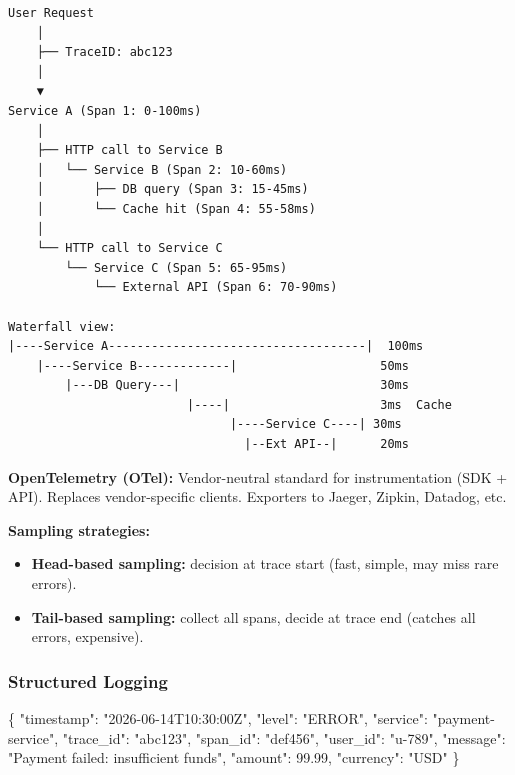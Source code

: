 \documentclass[11pt]{article}
\providecommand{\tightlist}{\setlength{\itemsep}{1pt}\setlength{\parskip}{0pt}}
\newenvironment{Shaded}{\begin{snugshade}}{\end{snugshade}}
\newcommand{\DataTypeTok}[1]{\textcolor[rgb]{0.16,0.50,0.73}{#1}}
\newcommand{\FloatTok}[1]{\textcolor[rgb]{0.96,0.45,0.00}{#1}}
\newcommand{\FunctionTok}[1]{\textcolor[rgb]{0.56,0.27,0.68}{#1}}
\newcommand{\StringTok}[1]{\textcolor[rgb]{0.96,0.31,0.31}{#1}}
\begin{document}
\begin{verbatim}
User Request
    │
    ├── TraceID: abc123
    │
    ▼
Service A (Span 1: 0-100ms)
    │
    ├── HTTP call to Service B
    │   └── Service B (Span 2: 10-60ms)
    │       ├── DB query (Span 3: 15-45ms)
    │       └── Cache hit (Span 4: 55-58ms)
    │
    └── HTTP call to Service C
        └── Service C (Span 5: 65-95ms)
            └── External API (Span 6: 70-90ms)

Waterfall view:
|----Service A------------------------------------|  100ms
    |----Service B-------------|                    50ms
        |---DB Query---|                            30ms
                         |----|                     3ms  Cache
                               |----Service C----| 30ms
                                 |--Ext API--|      20ms
\end{verbatim}

\textbf{OpenTelemetry (OTel):} Vendor-neutral standard for instrumentation (SDK + API). Replaces vendor-specific clients. Exporters to Jaeger, Zipkin, Datadog, etc.

\textbf{Sampling strategies:}

\begin{itemize}
\tightlist
\item
  \textbf{Head-based sampling:} decision at trace start (fast, simple, may miss rare errors).
\item
  \textbf{Tail-based sampling:} collect all spans, decide at trace end (catches all errors, expensive).
\end{itemize}

\subsubsection{Structured Logging}\label{structured-logging}


\begin{Shaded}
\begin{Highlighting}[]
\FunctionTok{\{}
  \DataTypeTok{"timestamp"}\FunctionTok{:} \StringTok{"2026{-}06{-}14T10:30:00Z"}\FunctionTok{,}
  \DataTypeTok{"level"}\FunctionTok{:} \StringTok{"ERROR"}\FunctionTok{,}
  \DataTypeTok{"service"}\FunctionTok{:} \StringTok{"payment{-}service"}\FunctionTok{,}
  \DataTypeTok{"trace\_id"}\FunctionTok{:} \StringTok{"abc123"}\FunctionTok{,}
  \DataTypeTok{"span\_id"}\FunctionTok{:} \StringTok{"def456"}\FunctionTok{,}
  \DataTypeTok{"user\_id"}\FunctionTok{:} \StringTok{"u{-}789"}\FunctionTok{,}
  \DataTypeTok{"message"}\FunctionTok{:} \StringTok{"Payment failed: insufficient funds"}\FunctionTok{,}
  \DataTypeTok{"amount"}\FunctionTok{:} \FloatTok{99.99}\FunctionTok{,}
  \DataTypeTok{"currency"}\FunctionTok{:} \StringTok{"USD"}
\FunctionTok{\}}
\end{Highlighting}
\end{Shaded}
\end{document}
